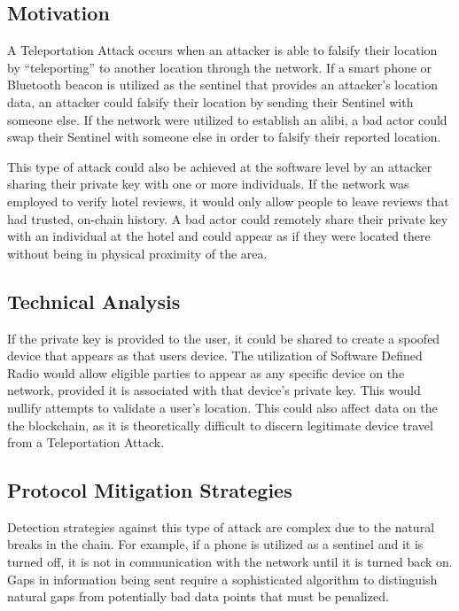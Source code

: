 \documentclass{article}
\begin{document}
\subsection{Motivation}
A Teleportation Attack occurs when an attacker is able to falsify their location by ``teleporting'' to another location through the network. If a smart phone or Bluetooth beacon is utilized as the \Gls{sentinel} that provides an attacker's location data, an attacker could falsify their location by sending their Sentinel with someone else. If the network were utilized to establish an alibi, a bad actor could swap their Sentinel with someone else in order to falsify their reported location. 

This type of attack could also be achieved at the software level by an attacker sharing their private key with one or more individuals. If the network was employed to verify hotel reviews, it would only allow people to leave reviews that had trusted, on-chain history. A bad actor could remotely share their private key with an individual at the hotel and could appear as if they were located there without being in physical proximity of the area.

\subsection{Technical Analysis}
If the private key is provided to the user, it could be shared to create a spoofed device that appears as that users device. The utilization of Software Defined Radio would allow eligible parties to appear as any specific device on the network, provided it is associated with that device's private key. This would nullify attempts to validate a user's location. This could also affect data on the the blockchain, as it is theoretically difficult to discern legitimate device travel from a Teleportation Attack. 

\subsection{Protocol Mitigation Strategies}
Detection strategies against this type of attack are complex due to the natural breaks in the chain. For example, if a phone is utilized as a \Gls{sentinel} and it is turned off, it is not in communication with the network until it is turned back on. Gaps in information being sent require a sophisticated algorithm to distinguish natural gaps from potentially bad data points that must be penalized. 
\end{document}
